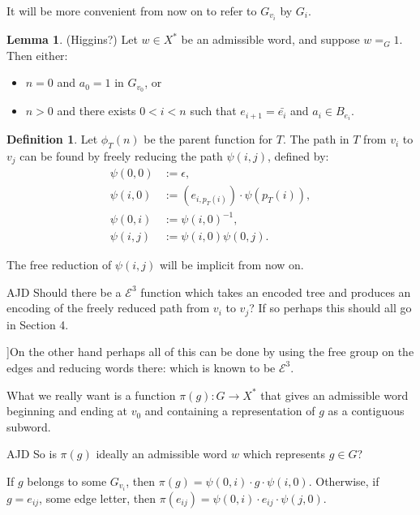 \documentclass[a4paper]{article}
\newcommand{\grz}[1]{$\mathcal{E}^{#1}$}	%
\theoremstyle{plain}
\theoremstyle{definition}
\newtheorem{lemma}[theorem]{Lemma}
\newtheorem{definition}[theorem]{Definition}
\newenvironment{ad}{\noindent\color{green} AJD }{}
\newcommand{\ajd}[1]{
\begin{ad} #1 \end{ad}}
\begin{document}
It will be more convenient from now on to refer to $G_{v_i}$ by $G_i$.

\begin{lemma}
\label{trivialnormalform}
(Higgins?)
Let $w \in X^{\ast}$ be an admissible word, and suppose $w =_G 1$. Then either:
\begin{itemize}
	\item $n=0$ and $a_0=1$ in $G_{v_0}$, or
	\item $n > 0$ and there exists $0<i<n$ such that $e_{i+1}=\bar{e_i}$ and $a_i \in B_{e_i}$.
\end{itemize}
\end{lemma}

\begin{definition}
Let $\phi_T(n)$ be the parent function for $T$. The path in $T$ from $v_i$ to $v_j$ can be found by freely reducing the path $\psi(i,j)$, defined by:
\begin{equation}\begin{split}
\psi(0,0) &:= \epsilon, \\
\psi(i,0) &:= (e_{i,p_T(i)}) \cdot \psi(p_T(i)), \\
\psi(0,i) &:= \psi(i,0)^{-1}, \\
\psi(i,j) &:= \psi(i,0) \psi(0,j).
\end{split}\end{equation}

The free reduction of $\psi(i,j)$ will be implicit from now on.
\ajd{Should there be a \grz{3} 
function which takes an encoded tree and produces
an encoding of  the freely reduced path from $v_i$ to $v_j$? If so perhaps
this should all go in Section 4. 

]On the other hand perhaps all of this
can be done by using the free group on the edges and reducing words there:
which is  known  to be \grz{3}.}

What we really want is a function $\pi(g):G \rightarrow X^{\ast}$ that gives an admissible word beginning and ending at $v_0$ and containing a representation of $g$ as a contiguous subword. 
\ajd{So is $\pi(g)$ ideally an admissible word $w$ which represents 
$g\in G$?}

If $g$ belongs to some $G_{v_i}$, then $\pi(g) = \psi(0,i) \cdot g \cdot \psi(i,0)$. Otherwise, if $g = e_{ij}$, some edge letter, then $\pi(e_{ij}) = \psi(0,i) \cdot e_{ij} \cdot \psi(j,0)$.
\end{definition}
\end{document}
